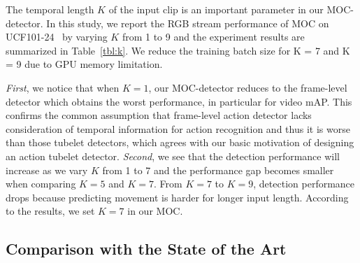 \documentclass[runningheads]{llncs}
\begin{document}
The temporal length $K$ of the input clip is an important parameter in our MOC-detector. In this study, we report the RGB stream performance of MOC on UCF101-24~\cite{UCF101} by varying $K$ from 1 to 9 and the experiment results are summarized in Table~\ref{tbl:k}. We reduce the training batch size for K = 7 and K = 9 due to GPU memory limitation.

{\em First}, we notice that when $K = 1$, our  MOC-detector reduces to the frame-level detector which obtains the worst performance, in particular for video mAP. This confirms the common assumption that frame-level action detector lacks consideration of temporal information for action recognition and thus it is worse than those tubelet detectors, which agrees with our basic motivation of designing an action tubelet detector. {\em Second}, we see that the detection performance will increase as we vary $K$ from 1 to 7 and the performance gap becomes smaller when comparing $K = 5$ and $K = 7$. From $K = 7$ to $K = 9$, detection performance drops because predicting movement is harder for longer input length.  According to the results, we set $K = 7$ in our MOC.

\subsection{Comparison with the State of the Art}\label{SOTA}
\end{document}
